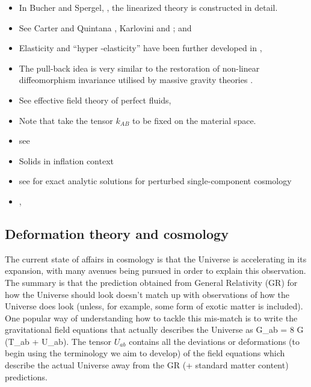 \begin{itemize}
\item In Bucher and Spergel, \cite{Bucher:1998mh}, the linearized theory is constructed in detail.
\item See Carter and Quintana \cite{Carter21111972, Carter:1977qf}, Karlovini \cite{Karlovini:2002fc, Karlovini:2003xi, Karlovini:2004gq, Karlovini:2007ut} and \cite{Beig:2002pk, Frauendiener:2007yx, Brito:2009jj, Pourtsidou:2013nha}; \cite{Battye:2005ik}
\cite{Balthazar:2014oza} and \cite{Dubovsky:2011sj}
\item Elasticity and ``hyper -elasticity'' have been further developed in \cite{Carter:1982xm}, \cite{Carter:2006cw}
\item The pull-back idea is very similar to the restoration of non-linear diffeomorphism invariance utilised by massive gravity theories \cite{deRham:2014zqa}.
\item See effective field theory of perfect fluids, \cite{Ballesteros:2012kv}
\item Note that \cite{Karlovini:2002fc} take the tensor $k_{AB}$ to be fixed on the material space.
\item see \cite{Bel:1996pb} \cite{Polak:2007dm}
\item Solids in inflation context \cite{Gruzinov:2004ty, Endlich:2012pz, Bartolo:2014xfa}
\item see \cite{Skovran:2014dka} for exact analytic solutions for perturbed single-component cosmology 
\item \cite{Frauendiener:2007yx}, \cite{Kijowski:1994eq}
\end{itemize}

\subsection{Deformation theory and cosmology}
The current state of affairs in cosmology is that the Universe is accelerating in its expansion, with many avenues being pursued in order to explain this observation. The summary is that the prediction obtained from General Relativity (GR) for how the Universe should look doesn't match up with observations of how the Universe does look (unless, for example, some form of exotic matter is included). One popular way of understanding how to tackle this mis-match is to write the gravitational field equations that actually describes the Universe as
\bea
G_{ab} = 8 \pi G \left(T_{ab} + U_{ab}\right).
\eea
The tensor $U_{ab}$ contains all the deviations or deformations (to begin using the terminology we aim to develop) of the field equations which describe the actual Universe away from the GR (+ standard matter content) predictions. 

